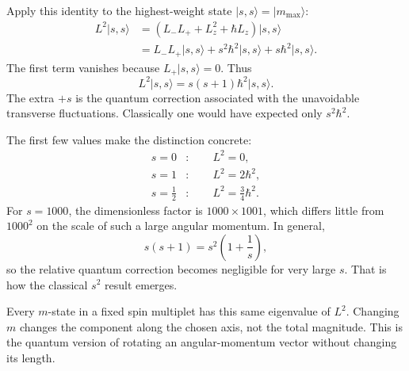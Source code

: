 Apply this identity to the highest-weight state \(\lvert s,s\rangle=\lvert m_{\max}\rangle\):
\begin{align}
L^2\lvert s,s\rangle
&=\left(L_-L_++L_z^2+\hbar L_z\right)\lvert s,s\rangle \\
&=L_-L_+\lvert s,s\rangle
+s^2\hbar^2\lvert s,s\rangle
+s\hbar^2\lvert s,s\rangle.
\end{align}
The first term vanishes because \(L_+\lvert s,s\rangle=0\). Thus
\begin{equation}
L^2\lvert s,s\rangle
=s(s+1)\hbar^2\lvert s,s\rangle.
\end{equation}
The extra \(+s\) is the quantum correction associated with the unavoidable transverse fluctuations. Classically one would have expected only \(s^2\hbar^2\).

The first few values make the distinction concrete:
\begin{align}
s=0 &: \qquad L^2=0,\\
s=1 &: \qquad L^2=2\hbar^2,\\
s=\frac12 &: \qquad L^2=\frac34\hbar^2.
\end{align}
For \(s=1000\), the dimensionless factor is \(1000\times1001\), which differs little from \(1000^2\) on the scale of such a large angular momentum. In general,
\begin{equation}
s(s+1)=s^2\left(1+\frac1s\right),
\end{equation}
so the relative quantum correction becomes negligible for very large \(s\). That is how the classical \(s^2\) result emerges.

Every \(m\)-state in a fixed spin multiplet has this same eigenvalue of \(L^2\). Changing \(m\) changes the component along the chosen axis, not the total magnitude. This is the quantum version of rotating an angular-momentum vector without changing its length.

\begin{classroomqa}
\end{classroomqa}

\begin{classroomqa}
\end{classroomqa}

